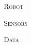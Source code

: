 \documentclass[final,t]{beamer}
\begin{document}
\begin{frame}{}
\begin{columns}[t]
            \begin{column}{.5\linewidth}

                \begin{block}{\textsc{Robot}}
                    \vspace*{6mm}
                    
                \end{block}

                \begin{block}{\textsc{Sensors}}
                    \vspace*{6mm}
                    
                \end{block}
                \begin{block}{\textsc{Data}}
                    \vspace*{6mm}
                 

                \end{block}
            \end{column}

          
        \end{columns}
    \end{frame}
\end{document}
